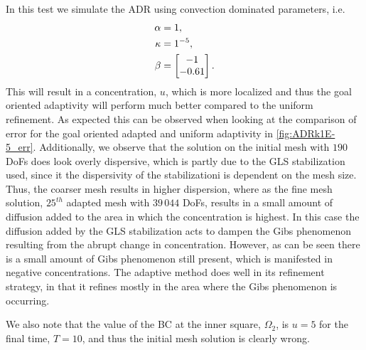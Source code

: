 \begin{test}[Convection Dominated ADR, $\kappa = 1\times10^{-5}$] \label{tst:ADRk1E-5}
    In this test we simulate the ADR using convection dominated parameters, i.e.
    \begin{align*}
        \alpha &= 1, \\
        \kappa &= 1\time 10^{-5}, \\
        \beta &= \begin{bmatrix} -1 \\ -0.61 \end{bmatrix}.
    \end{align*}
    This will result in a concentration, $u$, which is more localized and thus
    the goal oriented adaptivity will perform much better compared to the
    uniform refinement.  As expected this can be observed when looking at the
    comparison of error for the goal oriented adapted and uniform adaptivity in
    \autoref{fig:ADRk1E-5_err}. Additionally, we observe that the solution on
    the initial mesh with $190$ DoFs does look overly dispersive, which is
    partly due to the GLS stabilization used, since it the dispersivity of the
    stabilizationi is dependent on the mesh size. Thus, the coarser mesh results
    in higher dispersion, where as the fine mesh solution, $25^{th}$ adapted
    mesh with $39\, 044$ DoFs, results in a small amount of diffusion added to
    the area in which the concentration is highest. In this case the diffusion
    added by the GLS stabilization acts to dampen the Gibs phenomenon resulting
    from the abrupt change in concentration. However, as can be seen there is a
    small amount of Gibs phenomenon still present, which is manifested in
    negative concentrations. The adaptive method does well in its refinement
    strategy, in that it refines mostly in the area where the Gibs phenomenon
    is occurring.

    We also note that the value of the BC at the inner square, $\Omega_2$, is
    $u = 5$ for the final time, $T=10$, and thus the initial mesh solution is
    clearly wrong.


\end{test}
